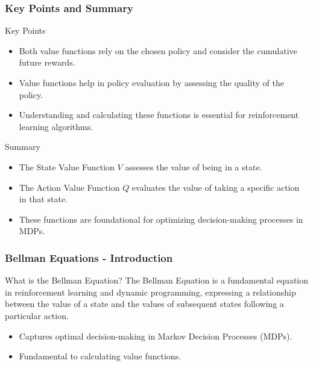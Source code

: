 \documentclass[aspectratio=169]{beamer}
\begin{document}
\begin{frame}[fragile]
  \frametitle{Key Points and Summary}
  \begin{block}{Key Points}
    \begin{itemize}
      \item Both value functions rely on the chosen policy and consider the cumulative future rewards.
      \item Value functions help in policy evaluation by assessing the quality of the policy.
      \item Understanding and calculating these functions is essential for reinforcement learning algorithms.
    \end{itemize}
  \end{block}
  
  \begin{block}{Summary}
    \begin{itemize}
      \item The State Value Function $V$ assesses the value of being in a state.
      \item The Action Value Function $Q$ evaluates the value of taking a specific action in that state.
      \item These functions are foundational for optimizing decision-making processes in MDPs.
    \end{itemize}
  \end{block}
\end{frame}

\begin{frame}[fragile]
  \frametitle{Bellman Equations - Introduction}
  \begin{block}{What is the Bellman Equation?}
    The Bellman Equation is a fundamental equation in reinforcement learning and dynamic programming, expressing a relationship between the value of a state and the values of subsequent states following a particular action.
  \end{block}
  
  \begin{itemize}
    \item Captures optimal decision-making in Markov Decision Processes (MDPs).
    \item Fundamental to calculating value functions.
  \end{itemize}
\end{frame}
\end{document}
